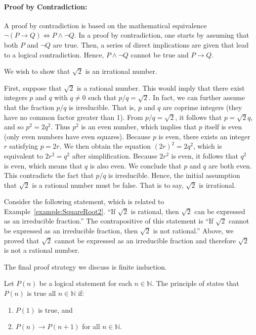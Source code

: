 \paragraph{Proof by Contradiction:}
A proof by contradiction is based on the mathematical equivalence $\neg (P \rightarrow Q) \Leftrightarrow P \wedge \neg Q$.
In a proof by contradiction, one starts by assuming that both $P$ and $\neg Q$ are true.
Then, a series of direct implications are given that lead to a logical contradiction.
Hence, $P \wedge \neg Q$ cannot be true and $P \rightarrow Q$.

\begin{example} \label{example:SquareRoot2}
We wish to show that $\sqrt{2}$ is an irrational number.

First, suppose that $\sqrt{2}$ is a rational number.
This would imply that there exist integers $p$ and $q$ with $q \neq 0$ such that $p/q = \sqrt{2}$.
In fact, we can further assume that the fraction $p/q$ is irreducible.
That is, $p$ and $q$ are coprime integers (they have no common factor greater than 1).
From $p/q = \sqrt{2}$, it follows that $p = \sqrt{2} q$, and so $p^2 = 2 q^2$.
Thus $p^2$ is an even number, which implies that $p$ itself is even (only even numbers have even squares).
Because $p$ is even, there exists an integer $r$ satisfying $p = 2r$.
We then obtain the equation $(2r)^2 = 2q^2$, which is equivalent to $2r^2 = q^2$ after simplification.
Because $2r^2$ is even, it follows that $q^2$ is even, which means that $q$ is also even.
We conclude that $p$ and $q$ are both even.
This contradicts the fact that $p/q$ is irreducible.
Hence, the initial assumption that $\sqrt{2}$ is a rational number must be false.
That is to say, $\sqrt{2}$ is irrational.
\end{example}

\begin{example}
Consider the following statement, which is related to Example~\ref{example:SquareRoot2}.
``If $\sqrt{2}$ is rational, then $\sqrt{2}$ can be expressed as an irreducible fraction.''
The contrapositive of this statement is ``If $\sqrt{2}$ cannot be expressed as an irreducible fraction, then $\sqrt{2}$ is not rational.''
Above, we proved that $\sqrt{2}$ cannot be expressed as an irreducible fraction and therefore $\sqrt{2}$ is not a rational number.
\end{example}

The final proof strategy we discuss is finite induction.

\begin{definition}
Let $P(n)$ be a logical statement for each $n\in \mathbb{N}$.
The principle of  states that $P(n)$ is true all $n\in \mathbb{N}$ if:
\begin{enumerate}
\item $P(1)$ is true, and
\item $P(n)\to P(n+1)$ for all $n\in \mathbb{N}$.
\end{enumerate}
\end{definition}

